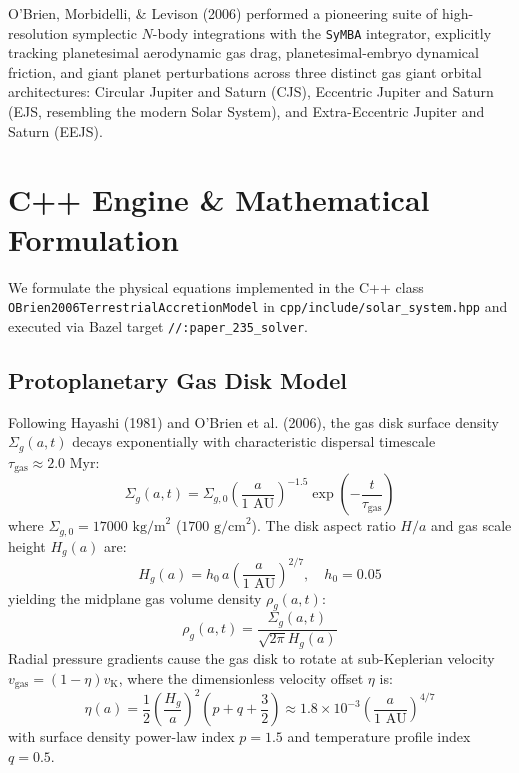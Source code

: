 \documentclass[11pt,a4paper]{article}
\begin{document}
O'Brien, Morbidelli, \& Levison (2006) performed a pioneering suite of high-resolution symplectic $N$-body integrations with the \texttt{SyMBA} integrator, explicitly tracking planetesimal aerodynamic gas drag, planetesimal-embryo dynamical friction, and giant planet perturbations across three distinct gas giant orbital architectures: Circular Jupiter and Saturn (CJS), Eccentric Jupiter and Saturn (EJS, resembling the modern Solar System), and Extra-Eccentric Jupiter and Saturn (EEJS).

\section{C++ Engine \& Mathematical Formulation}
We formulate the physical equations implemented in the C++ class \texttt{OBrien2006TerrestrialAccretionModel} in \texttt{cpp/include/solar\_system.hpp} and executed via Bazel target \texttt{//:paper\_235\_solver}.

\subsection{Protoplanetary Gas Disk Model}
Following Hayashi (1981) and O'Brien et al. (2006), the gas disk surface density $\Sigma_g(a, t)$ decays exponentially with characteristic dispersal timescale $\tau_{\text{gas}} \approx 2.0\text{ Myr}$:
\begin{equation}
\Sigma_g(a, t) = \Sigma_{g,0} \left(\frac{a}{1\text{ AU}}\right)^{-1.5} \exp\left(-\frac{t}{\tau_{\text{gas}}}\right)
\end{equation}
where $\Sigma_{g,0} = 17000\text{ kg/m}^2$ ($1700\text{ g/cm}^2$). The disk aspect ratio $H/a$ and gas scale height $H_g(a)$ are:
\begin{equation}
H_g(a) = h_0 \, a \left(\frac{a}{1\text{ AU}}\right)^{2/7}, \quad h_0 = 0.05
\end{equation}
yielding the midplane gas volume density $\rho_g(a, t)$:
\begin{equation}
\rho_g(a, t) = \frac{\Sigma_g(a, t)}{\sqrt{2\pi} H_g(a)}
\end{equation}
Radial pressure gradients cause the gas disk to rotate at sub-Keplerian velocity $v_{\text{gas}} = (1 - \eta) v_{\text{K}}$, where the dimensionless velocity offset $\eta$ is:
\begin{equation}
\eta(a) = \frac{1}{2} \left(\frac{H_g}{a}\right)^2 \left(p + q + \frac{3}{2}\right) \approx 1.8 \times 10^{-3} \left(\frac{a}{1\text{ AU}}\right)^{4/7}
\end{equation}
with surface density power-law index $p = 1.5$ and temperature profile index $q = 0.5$.
\end{document}
